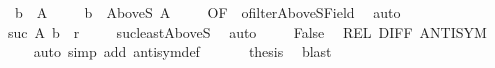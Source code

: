 \begin{isabellebody}
\ {\isacharasterisk}{\kern0pt}{\isacharasterisk}{\kern0pt}{\isacharcolon}{\kern0pt}\ {\isachardoublequoteopen}b\ {\isasymnotin}\ A{\isachardoublequoteclose}\isanewline
\ \ \ \isamarkupfalse%
\ {\isachardoublequoteopen}b\ {\isasymin}\ AboveS\ A{\isachardoublequoteclose}\isanewline
\ \ \ \isamarkupfalse%
\ OF\ {\isacharasterisk}{\kern0pt}\ ofilter{\isacharunderscore}{\kern0pt}AboveS{\isacharunderscore}{\kern0pt}Field\ \isamarkupfalse%
\ auto\isanewline
\ \ \ \isamarkupfalse%
\ {\isachardoublequoteopen}{\isacharparenleft}{\kern0pt}suc\ A{\isacharcomma}{\kern0pt}\ b{\isacharparenright}{\kern0pt}\ {\isasymin}\ r{\isachardoublequoteclose}\isanewline
\ \ \ \isamarkupfalse%
\ suc{\isacharunderscore}{\kern0pt}least{\isacharunderscore}{\kern0pt}AboveS\ \isamarkupfalse%
\ auto\isanewline
\ \ \ \isamarkupfalse%
\ False\ \isamarkupfalse%
\ REL\ DIFF\ ANTISYM\ {\isacharasterisk}{\kern0pt}\isanewline
\ \ \ \isamarkupfalse%
\ {\isacharparenleft}{\kern0pt}auto\ simp\ add{\isacharcolon}{\kern0pt}\ antisym{\isacharunderscore}{\kern0pt}def{\isacharparenright}{\kern0pt}\isanewline
\ \ \isacommand{{\isacharbraceright}{\kern0pt}}\isamarkupfalse%
\isanewline
\ \ \isamarkupfalse%
\ {\isacharquery}{\kern0pt}thesis\ \isamarkupfalse%
\ blast\isanewline
{}\isamarkupfalse%
%
\endisatagproof
{\isafoldproof}%
%
\isadelimproof
\isanewline
%
\endisadelimproof
\isanewline
{}\isamarkupfalse%
\ \isanewline
%
\isadelimtheory
\isanewline
%
\endisadelimtheory
%
\isatagtheory
{}\isamarkupfalse%
%
\endisatagtheory
{\isafoldtheory}%
%
\isadelimtheory
%
\endisadelimtheory
%
\end{isabellebody}%
\endinput
